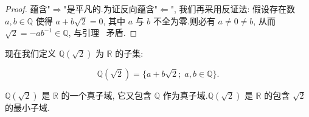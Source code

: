 \begin{proof}
蕴含"$\Rightarrow$"是平凡的.为证反向蕴含"$\Longleftarrow$", 我们再采用反证法: 假设存在数 $a, b \in \mathbb{Q}$ 使得 $a + b\sqrt{2} = 0$, 其中 $a$ 与 $b$ 不全为零.则必有 $a \neq 0 \neq b$, 从而 $\sqrt{2} = -ab^{-1} \in \mathbb{Q}$, 与引理~ 矛盾.
\end{proof}

现在我们定义 $\mathbb{Q}(\sqrt{2})$ 为 $\mathbb{R}$ 的子集:

\[
\mathbb{Q}(\sqrt{2}) = \{a + b\sqrt{2};\; a, b \in \mathbb{Q}\}.
\]

\begin{theorem}\label{thm:1.3.6}
$\mathbb{Q}(\sqrt{2})$ 是 $\mathbb{R}$ 的一个真子域, 它又包含 $\mathbb{Q}$ 作为真子域.$\mathbb{Q}(\sqrt{2})$ 是 $\mathbb{R}$ 的包含 $\sqrt{2}$ 的最小子域.
\end{theorem}

